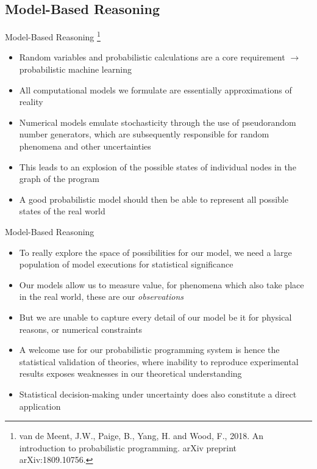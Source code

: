 \documentclass[AERbeamer%
              ,optEnglish%
              ,optBiber%
              ,optBibstyleAlphabetic%
              ,optBeamerClassicFormat%
              ]{AERlatex}%
\begin{document}
\subsection{Model-Based Reasoning}

\begin{frame}[c]{Model-Based Reasoning \footnote{van de Meent, J.W., Paige, B., Yang, H. and Wood, F., 2018.
                                                 An introduction to probabilistic programming. arXiv preprint
                                                 arXiv:1809.10756.}}
    \centering
    \begin{itemize}
        \item Random variables and probabilistic calculations are a core requirement $\rightarrow$ probabilistic machine learning
        \item All computational models we formulate are essentially approximations of reality
        \item Numerical models emulate stochasticity through the use of pseudorandom number generators, which are subsequently
              responsible for random phenomena and other uncertainties
        \item This leads to an explosion of the possible states of individual nodes in the graph of the program
        \item A good probabilistic model should then be able to represent all possible states of the real world
    \end{itemize}
\end{frame}


\begin{frame}[c]{Model-Based Reasoning}
    \centering
    \begin{itemize}
        \item To really explore the space of possibilities for our model, we need a large population of model executions
              for statistical significance
        \item Our models allow us to measure value, for phenomena which also take place in the real world, these are
              our \textit{observations}
        \item But we are unable to capture every detail of our model be it for physical reasons, or numerical constraints
        \item A welcome use for our probabilistic programming system is hence the statistical validation of theories, where
              inability to reproduce experimental results exposes weaknesses in our theoretical understanding
        \item Statistical decision-making under uncertainty does also constitute a direct application
    \end{itemize}
\end{frame}
\end{document}
